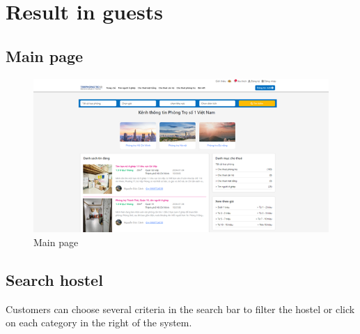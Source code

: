\documentclass[../Main.tex]{subfiles}
\begin{document}
\section{Result in guests}

\subsection{Main page}

\begin{figure}[H]
    \centering
    \includegraphics[width=\textwidth]{Figure/Picture21.png}
    \caption{Main page}
\end{figure}

\subsection{Search hostel}

Customers can choose several criteria in the search bar to filter the hostel or click on each category in the right of the system.
\end{document}
